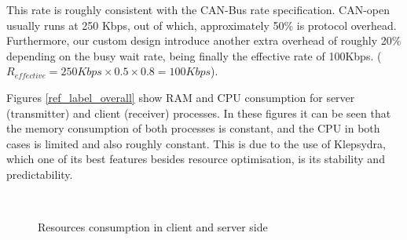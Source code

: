\documentclass[a4paper,twocolumn]{esapub2005} %
\begin{document}
This rate is roughly consistent with the CAN-Bus rate specification. CAN-open usually runs at 250 Kbps, out of which, approximately 50\% is protocol overhead. Furthermore, our custom design introduce another extra overhead of roughly 20\% depending on the busy wait rate, being finally the effective rate of 100Kbps. ($R_{effective} = 250{Kbps} \times 0.5 \times 0.8 = 100{Kbps}$).

Figures \ref{ref_label_overall} show RAM and CPU consumption for server (transmitter) and client (receiver) processes. In these figures it can be seen that the memory consumption of both processes is constant, and the CPU in both cases is limited and also roughly constant. This is due to the use of Klepsydra, which one of its best features besides resource optimisation, is its stability and predictability.

\begin{figure}[!htbp]
  \centering
  \\
  \caption{\label{fig:ref_label_overall} Resources consumption in client and server side}
\end{figure}
\end{document}
